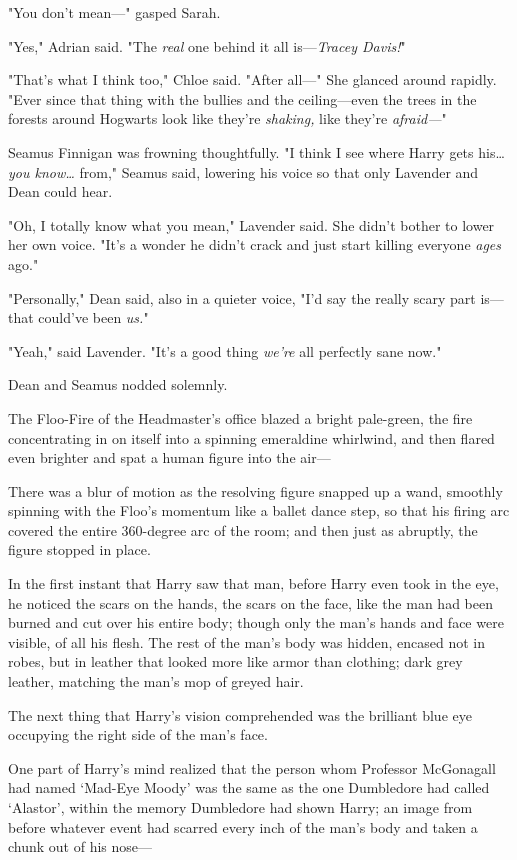 "You don't mean---" gasped Sarah.

"Yes," Adrian said. "The \emph{real} one behind it all is---\emph{Tracey
Davis!}"

"That's what I think too," Chloe said. "After all---" She glanced around
rapidly. "Ever since that thing with the bullies and the ceiling---even the
trees in the forests around Hogwarts look like they're \emph{shaking,} like
they're \emph{afraid---}"

Seamus Finnigan was frowning thoughtfully. "I think I see where Harry gets
his{\ldots} \emph{you know{\ldots}} from," Seamus said, lowering his voice so
that only Lavender and Dean could hear.

"Oh, I totally know what you mean," Lavender said. She didn't bother to lower
her own voice. "It's a wonder he didn't crack and just start killing everyone
\emph{ages} ago."

"Personally," Dean said, also in a quieter voice, "I'd say the really scary
part is---that could've been \emph{us.}"

"Yeah," said Lavender. "It's a good thing \emph{we're} all perfectly sane now."

Dean and Seamus nodded solemnly.

The Floo-Fire of the Headmaster's office blazed a bright pale-green, the fire
concentrating in on itself into a spinning emeraldine whirlwind, and then
flared even brighter and spat a human figure into the air---

There was a blur of motion as the resolving figure snapped up a wand, smoothly
spinning with the Floo's momentum like a ballet dance step, so that his firing
arc covered the entire 360-degree arc of the room; and then just as abruptly,
the figure stopped in place.

In the first instant that Harry saw that man, before Harry even took in the
eye, he noticed the scars on the hands, the scars on the face, like the man had
been burned and cut over his entire body; though only the man's hands and face
were visible, of all his flesh. The rest of the man's body was hidden, encased
not in robes, but in leather that looked more like armor than clothing; dark
grey leather, matching the man's mop of greyed hair.

The next thing that Harry's vision comprehended was the brilliant blue eye
occupying the right side of the man's face.

One part of Harry's mind realized that the person whom Professor McGonagall had
named `Mad-Eye Moody' was the same as the one Dumbledore had called `Alastor',
within the memory Dumbledore had shown Harry; an image from before whatever
event had scarred every inch of the man's body and taken a chunk out of his
nose---

